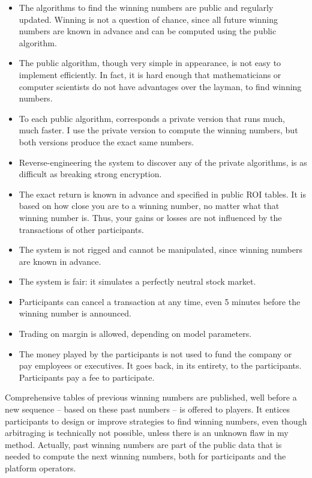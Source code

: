 \documentclass[oneside,10pt]{book}
\begin{document}
\begin{itemize}
\item	The algorithms to find the winning numbers are public and regularly updated. Winning is not a question of chance, since all future winning numbers are known in advance and can be computed using the public algorithm.
\item 	The public algorithm, though very simple in appearance, is not easy to implement efficiently. In fact, it is hard enough that mathematicians or computer scientists do not have advantages over the layman, to find winning numbers.
\item 	To each public algorithm, corresponds a private version that runs much, much faster. I use the private version to compute the winning numbers, but both versions produce the exact same numbers.
\item 	Reverse-engineering the system to discover any of the private algorithms, is as difficult as breaking strong encryption.
\item 	The exact return is known in advance and specified in public ROI tables. It is based on how close you are to a winning number, no matter what that winning number is. Thus, your gains or losses are not influenced by the transactions of other participants.
\item 	The system is not rigged and cannot be manipulated, since winning numbers are known in advance.
\item 	The system is fair: it simulates a perfectly neutral stock market.
\item 	Participants can cancel a transaction at any time, even 5 minutes before the winning number is announced.
\item 	Trading on margin is allowed, depending on model parameters.
\item 	The money played by the participants is not used to fund the company or pay employees or executives. It goes back, in its entirety, to the participants. Participants pay a fee to participate.
\end{itemize}\vspace{1ex}

\noindent Comprehensive tables of previous winning numbers are published, well before a new sequence -- based on these past numbers -- is offered to players. It entices participants to design or improve strategies to find winning numbers, even though arbitraging is technically not possible, unless there is an unknown flaw in my method. Actually, past winning numbers are part of the public data that is needed to compute the next winning numbers, both for participants and the platform operators.
\end{document}
